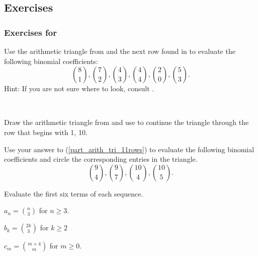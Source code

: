 
\subsection{Exercises}


\subsubsection*{Exercises for  \subarithtri}

\begin{exer}[\exerP] %
\label{exer_arith_tri_eval_small}
    Use the arithmetic triangle from  and the next row found in  to evaluate the following binomial coefficients:
        $$\binom{8}{1}, \binom{7}{2}, \binom{4}{3}, \binom{4}{4}, \binom{2}{0}, \binom{5}{3}.$$
    Hint: If you are not sure where to look, consult .
\end{exer}

\begin{exer} [\exerP] %
\label{exer_arith_tri_more_rows}
~
    \begin{exerpart}
        \item \label{part_arith_tri_11rows} Draw the arithmetic triangle from  and use  to continue the triangle through the row that begins with 1, 10.
        \item Use your answer to (\ref{part_arith_tri_11rows}) to evaluate the following binomial coefficients and circle the corresponding entries in the triangle.
            $$\binom{9}{4}, \binom{9}{7}, \binom{10}{4}, \binom{10}{5}.$$
    \end{exerpart}
\end{exer}

\begin{exer}[\exerU] %
\label{exer_seq_binom_coeffs}
    Evaluate the first six terms of each sequence.
        \begin{exerpart}
            \item $\displaystyle a_n= \binom{n}{3}$ for $n \ge 3$.
            \item $\displaystyle b_k = \binom{2k}{3}$ for $k \ge 2$
            \item $\displaystyle c_m = \binom{m+4}{m}$ for $m \ge 0$.
        \end{exerpart}
\end{exer}

